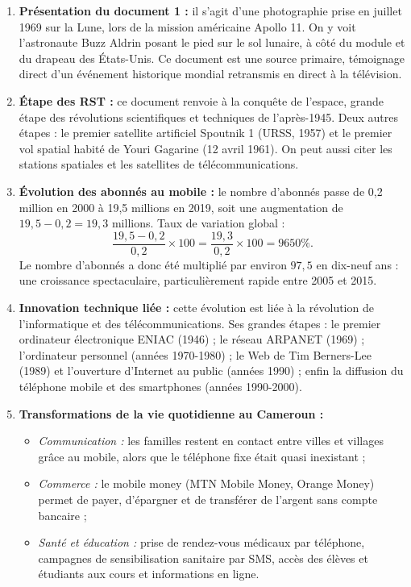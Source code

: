 \documentclass[11pt]{article}
\newcommand{\cle}[1]{{\popxbold\color{popdark}#1}}
\begin{document}
\begin{corrige}
\begin{enumerate}
\item \textbf{Présentation du document 1 :} il s'agit d'une photographie prise en juillet 1969 sur la Lune, lors de la mission américaine Apollo 11. On y voit l'astronaute Buzz Aldrin posant le pied sur le sol lunaire, à côté du module et du drapeau des États-Unis. Ce document est une source primaire, témoignage direct d'un événement historique mondial retransmis en direct à la télévision.
\item \textbf{Étape des RST :} ce document renvoie à la \cle{conquête de l'espace}, grande étape des révolutions scientifiques et techniques de l'après-1945. Deux autres étapes : le premier satellite artificiel Spoutnik 1 (URSS, 1957) et le premier vol spatial habité de Youri Gagarine (12 avril 1961). On peut aussi citer les stations spatiales et les satellites de télécommunications.
\item \textbf{Évolution des abonnés au mobile :} le nombre d'abonnés passe de 0,2 million en 2000 à 19,5 millions en 2019, soit une augmentation de $19,5 - 0,2 = 19,3$ millions. Taux de variation global :
\[ \frac{19,5 - 0,2}{0,2} \times 100 = \frac{19,3}{0,2} \times 100 = 9650 \%. \]
Le nombre d'abonnés a donc été multiplié par environ $97,5$ en dix-neuf ans : une croissance spectaculaire, particulièrement rapide entre 2005 et 2015.
\item \textbf{Innovation technique liée :} cette évolution est liée à la révolution de l'\cle{informatique et des télécommunications}. Ses grandes étapes : le premier ordinateur électronique ENIAC (1946) ; le réseau ARPANET (1969) ; l'ordinateur personnel (années 1970-1980) ; le Web de Tim Berners-Lee (1989) et l'ouverture d'Internet au public (années 1990) ; enfin la diffusion du téléphone mobile et des smartphones (années 1990-2000).
\item \textbf{Transformations de la vie quotidienne au Cameroun :}
\begin{itemize}
\item \emph{Communication :} les familles restent en contact entre villes et villages grâce au mobile, alors que le téléphone fixe était quasi inexistant ;
\item \emph{Commerce :} le mobile money (MTN Mobile Money, Orange Money) permet de payer, d'épargner et de transférer de l'argent sans compte bancaire ;
\item \emph{Santé et éducation :} prise de rendez-vous médicaux par téléphone, campagnes de sensibilisation sanitaire par SMS, accès des élèves et étudiants aux cours et informations en ligne.

\end{itemize}
\end{enumerate}
\end{corrige}
\end{document}
